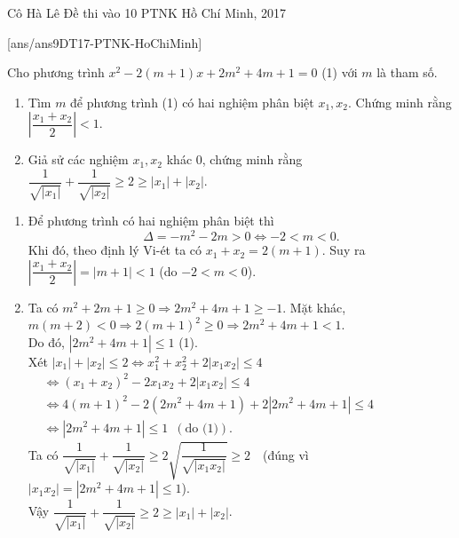 \begin{name}
{Cô Hà Lê}
{Đề thi vào 10 PTNK Hồ Chí Minh,  2017}
\end{name}
\setcounter{ex}{0}
[ans/ans9DT17-PTNK-HoChiMinh]
\begin{ex}%
Cho phương trình $x^2-2(m+1)x+2m^2+4m+1=0$ (1) với $m$ là tham số.
    \hfill
    \begin{enumerate}
        \item Tìm $m$ để phương trình (1) có hai nghiệm phân biệt $x_1, x_2$. Chứng minh rằng $\left|\dfrac{x_1+x_2}{2} \right| <1$.
        \item Giả sử các nghiệm $x_1, x_2$ khác $0$, chứng minh rằng $\dfrac{1}{\sqrt{|x_1|}}+\dfrac{1}{\sqrt{|x_2|}} \ge 2 \ge |x_1|+|x_2|$.
    \end{enumerate}
\loigiai
    {
    \begin{enumerate}
        \item Để phương trình có hai nghiệm phân biệt thì 
\[\Delta = -m^2-2m>0 \Leftrightarrow -2<m<0.\]
Khi đó, theo định lý Vi-ét ta có $x_1+x_2=2(m+1)$. Suy ra $\left|\dfrac{x_1+x_2}{2} \right|=|m+1| < 1$ (do $-2<m<0$).

        \item Ta có $m^2+2m+1 \ge 0 \Rightarrow 2m^2+4m+1 \ge -1$. Mặt khác, $m(m+2) <0 \Rightarrow 2(m+1)^2 \ge 0 \Rightarrow 2m^2+4m+1 <1$.\\
Do đó, $|2m^2+4m+1| \le 1$ (1).\\
Xét $|x_1|+|x_2| \le 2 \Leftrightarrow x_1^2+x_2^2+2|x_1x_2| \le 4$\\
$ \begin{aligned}
& \Leftrightarrow (x_1+x_2)^2-2x_1x_2+2|x_1x_2| \le 4 \\
& \Leftrightarrow 4(m+1)^2-2(2m^2+4m+1)+2|2m^2+4m+1| \le 4\\
& \Leftrightarrow |2m^2+4m+1| \le 1  \,\,\,(\text{do (1)}).
\end{aligned}
$\\
Ta có $\dfrac{1}{\sqrt{|x_1|}}+\dfrac{1}{\sqrt{|x_2|}} \ge 2 \sqrt{\dfrac{1}{\sqrt{|x_1x_2|}} } \ge 2$ \,\, (đúng vì $|x_1x_2| =|2m^2+4m+1| \le 1$).\\
Vậy $\dfrac{1}{\sqrt{|x_1|}}+\dfrac{1}{\sqrt{|x_2|}} \ge 2 \ge |x_1|+|x_2|$.

    \end{enumerate}
    }
\end{ex}


